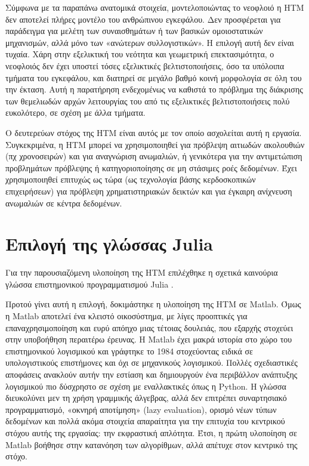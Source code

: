   Σύμφωνα με τα παραπάνω ανατομικά στοιχεία, μοντελοποιώντας το νεοφλοιό η HTM δεν αποτελεί πλήρες μοντέλο
  του ανθρώπινου εγκεφάλου. Δεν προσφέρεται για παράδειγμα για μελέτη των συναισθημάτων ή των βασικών ομοιοστατικών
  μηχανισμών, αλλά μόνο των «ανώτερων συλλογιστικών». Η επιλογή αυτή δεν είναι τυχαία. Χάρη στην εξελικτική του νεότητα και
  γεωμετρική επεκτασιμότητα, ο νεοφλοιός δεν έχει υποστεί τόσες εξελικτικές βελτιστοποιήσεις, όσο τα υπόλοιπα τμήματα του εγκεφάλου,
  και διατηρεί σε μεγάλο βαθμό κοινή μορφολογία σε όλη του την έκταση. Αυτή η παρατήρηση ενδεχομένως να καθιστά το πρόβλημα
  της διάκρισης των θεμελιωδών αρχών λειτουργίας του από τις εξελικτικές βελτιστοποιήσεις πολύ ευκολότερο, σε σχέση με άλλα τμήματα.

  Ο δευτερεύων στόχος της HTM είναι αυτός με τον οποίο ασχολείται αυτή η εργασία.
  Συγκεκριμένα, η HTM μπορεί να χρησιμοποιηθεί για πρόβλεψη αιτιωδών ακολουθιών (πχ χρονοσειρών) και για αναγνώριση ανωμαλιών,
  ή γενικότερα για την αντιμετώπιση προβλημάτων πρόβλεψης ή κατηγοριοποίησης σε μη στάσιμες ροές δεδομένων.
  Έχει χρησιμοποιηθεί επιτυχώς ως τώρα (ως τεχνολογία βάσης κερδοσκοπικών επιχειρήσεων) για πρόβλεψη χρηματιστηριακών δεικτών
  και για έγκαιρη ανίχνευση ανωμαλιών σε κέντρα δεδομένων.

\section{Επιλογή της γλώσσας Julia}

  Για την παρουσιαζόμενη υλοποίηση της HTM επιλέχθηκε η σχετικά καινούρια γλώσσα επιστημονικού προγραμματισμού Julia \parencite{bezansonJuliaFreshApproach2017}.

  Προτού γίνει αυτή η επιλογή, δοκιμάστηκε η υλοποίηση της HTM σε Matlab.
  Όμως η Matlab αποτελεί ένα κλειστό οικοσύστημα, με λίγες προοπτικές για επαναχρησιμοποίηση και ευρύ απόηχο μιας τέτοιας δουλειάς,
  που εξαρχής στοχεύει στην υποβοήθηση περαιτέρω έρευνας.
  Η Matlab έχει μακρά ιστορία στο χώρο του επιστημονικού λογισμικού και γράφτηκε το 1984 στοχεύοντας ειδικά σε υπολογιστικούς επιστήμονες και όχι σε μηχανικούς λογισμικού.
  Πολλές σχεδιαστικές αποφάσεις ανακλούν αυτήν την εστίαση και δημιουργούν ένα περιβάλλον ανάπτυξης λογισμικού πιο δύσχρηστο σε σχέση με εναλλακτικές όπως η Python.
  Η γλώσσα διευκολύνει μεν τη χρήση γραμμικής άλγεβρας, αλλά δεν επιτρέπει συναρτησιακό προγραμματισμό, «οκνηρή αποτίμηση» (lazy evaluation), ορισμό νέων τύπων δεδομένων
  και πολλά ακόμα στοιχεία απαραίτητα για την επιτυχία του κεντρικού στόχου αυτής της εργασίας: την εκφραστική απλότητα.
  Έτσι, η πρώτη υλοποίηση σε Matlab βοήθησε στην κατανόηση των αλγορίθμων, αλλά απέτυχε στον κεντρικό της στόχο.


